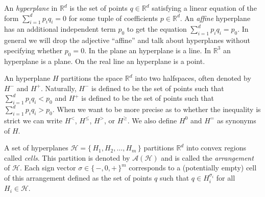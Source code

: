 An \emph{hyperplane} in \(\mathbb{R}^d\) is the set of points \(q \in \mathbb{R}^d\)
satisfying a linear equation of the form \(\sum_{i=1}^{d} p_i q_i = 0\) for
some tuple of coefficients \(p \in \mathbb{R}^d\). An \emph{affine} hyperplane has an
additional independent term \(p_0\) to get the equation \(\sum_{i=1}^{d}
p_i q_i = p_0\). In general we will drop the adjective ``affine'' and talk about
hyperplanes without specifying whether \(p_0 = 0\).
%
In the plane an hyperplane is a line. In \(\mathbb{R}^3\) an hyperplane is
a plane. On the real line an hyperplane is a point.

An hyperplane \(H\) partitions the space \(\mathbb{R}^d\) into two halfspaces,
often denoted by \(H^-\) and \(H^+\).
Naturally, \(H^-\) is defined to be the set of points such that
\(\sum_{i=1}^{d} p_i q_i < p_0 \) and \(H^+\) is defined to be the set of
points such that \(\sum_{i=1}^{d} p_i q_i > p_0 \). When we want to be more
precise as to whether the inequality is strict we can write \(H^{<}\),
\(H^{\leq}\), \(H^{>}\), or \(H^{\geq}\).
We also define \(H^0\) and \(H^{=}\) as synonyms of \(H\).

A set of hyperplanes \(\mathcal{H} = \{\, H_1, H_2, \ldots, H_m\,\}\)
partitions \(\mathbb{R}^d\) into convex regions called \emph{cells}.
%
This partition is denoted by \(\mathcal{A}(\mathcal{H})\) and is called the
\emph{arrangement} of \(\mathcal{H}\).
%
Each sign vector \(\sigma \in {\{\,-,0,+\,\}}^{m}\) corresponds to a
(potentially empty) cell of this arrangement defined as the set of points \(q\)
such that \(q \in H_i^{\sigma_i}\) for all \(H_i \in \mathcal{H}\).







